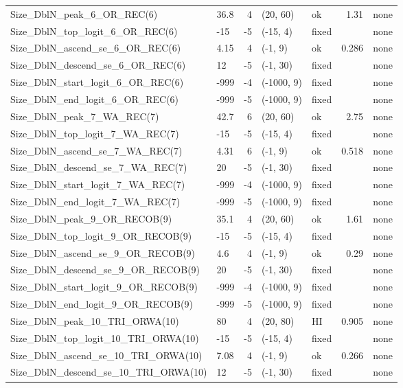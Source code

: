 \documentclass[
]{scrartcl}
\begin{document}
\begin{landscape}
\begin{longtable}{llrllrl}
Size\_DblN\_peak\_6\_OR\_REC(6) & 36.8 & 4 & (20, 60) & ok & 1.31 & none \\ 
Size\_DblN\_top\_logit\_6\_OR\_REC(6) & -15 & -5 & (-15, 4) & fixed &  & none \\ 
Size\_DblN\_ascend\_se\_6\_OR\_REC(6) & 4.15 & 4 & (-1, 9) & ok & 0.286 & none \\ 
Size\_DblN\_descend\_se\_6\_OR\_REC(6) & 12 & -5 & (-1, 30) & fixed &  & none \\ 
Size\_DblN\_start\_logit\_6\_OR\_REC(6) & -999 & -4 & (-1000, 9) & fixed &  & none \\ 
Size\_DblN\_end\_logit\_6\_OR\_REC(6) & -999 & -5 & (-1000, 9) & fixed &  & none \\ 
Size\_DblN\_peak\_7\_WA\_REC(7) & 42.7 & 6 & (20, 60) & ok & 2.75 & none \\ 
Size\_DblN\_top\_logit\_7\_WA\_REC(7) & -15 & -5 & (-15, 4) & fixed &  & none \\ 
Size\_DblN\_ascend\_se\_7\_WA\_REC(7) & 4.31 & 6 & (-1, 9) & ok & 0.518 & none \\ 
Size\_DblN\_descend\_se\_7\_WA\_REC(7) & 20 & -5 & (-1, 30) & fixed &  & none \\ 
Size\_DblN\_start\_logit\_7\_WA\_REC(7) & -999 & -4 & (-1000, 9) & fixed &  & none \\ 
Size\_DblN\_end\_logit\_7\_WA\_REC(7) & -999 & -5 & (-1000, 9) & fixed &  & none \\ 
Size\_DblN\_peak\_9\_OR\_RECOB(9) & 35.1 & 4 & (20, 60) & ok & 1.61 & none \\ 
Size\_DblN\_top\_logit\_9\_OR\_RECOB(9) & -15 & -5 & (-15, 4) & fixed &  & none \\ 
Size\_DblN\_ascend\_se\_9\_OR\_RECOB(9) & 4.6 & 4 & (-1, 9) & ok & 0.29 & none \\ 
Size\_DblN\_descend\_se\_9\_OR\_RECOB(9) & 20 & -5 & (-1, 30) & fixed &  & none \\ 
Size\_DblN\_start\_logit\_9\_OR\_RECOB(9) & -999 & -4 & (-1000, 9) & fixed &  & none \\ 
Size\_DblN\_end\_logit\_9\_OR\_RECOB(9) & -999 & -5 & (-1000, 9) & fixed &  & none \\ 
Size\_DblN\_peak\_10\_TRI\_ORWA(10) & 80 & 4 & (20, 80) & HI & 0.905 & none \\ 
Size\_DblN\_top\_logit\_10\_TRI\_ORWA(10) & -15 & -5 & (-15, 4) & fixed &  & none \\ 
Size\_DblN\_ascend\_se\_10\_TRI\_ORWA(10) & 7.08 & 4 & (-1, 9) & ok & 0.266 & none \\ 
Size\_DblN\_descend\_se\_10\_TRI\_ORWA(10) & 12 & -5 & (-1, 30) & fixed &  & none \\ 

\end{longtable}
\end{landscape}
\end{document}
